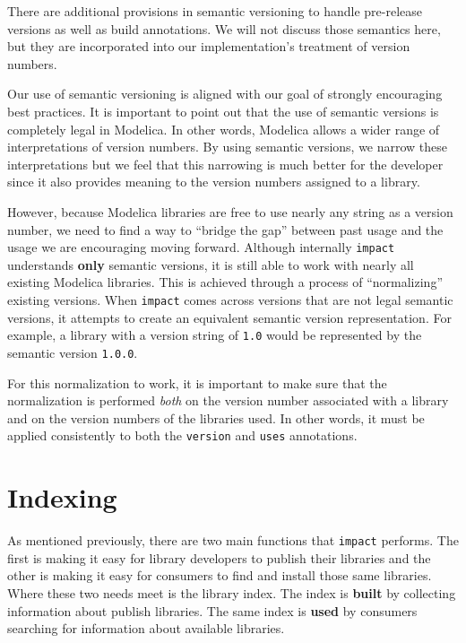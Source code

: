 \documentclass[11pt,a4paper,twocolumn]{article}
\newcommand{\code}[1]{\texttt{#1}} %
\begin{document}
There are additional provisions in semantic versioning to handle
pre-release versions as well as build annotations.  We will not
discuss those semantics here, but they are incorporated into our
implementation's treatment of version numbers.

Our use of semantic versioning is aligned with our goal of strongly
encouraging best practices.  It is important to point out that the use
of semantic versions is completely legal in Modelica.  In other words,
Modelica allows a wider range of interpretations of version numbers.
By using semantic versions, we narrow these interpretations but we
feel that this narrowing is much better for the developer since it
also provides meaning to the version numbers assigned to a library.

However, because Modelica libraries are free to use nearly any string
as a version number, we need to find a way to ``bridge the gap''
between past usage and the usage we are encouraging moving forward.
Although internally \code{impact} understands {\bf only} semantic
versions, it is still able to work with nearly all existing Modelica
libraries.  This is achieved through a process of ``normalizing''
existing versions.  When \code{impact} comes across versions that are
not legal semantic versions, it attempts to create an equivalent
semantic version representation.  For example, a library with a
version string of \code{1.0} would be represented by the semantic
version \code{1.0.0}.

For this normalization to work, it is important to make sure that the
normalization is performed {\em both} on the version number associated
with a library and on the version numbers of the libraries used.  In
other words, it must be applied consistently to both the
\code{version} and \code{uses} annotations.

\section{Indexing}

As mentioned previously, there are two main functions that
\code{impact} performs.  The first is making it easy for library
developers to publish their libraries and the other is making it easy
for consumers to find and install those same libraries.  Where these
two needs meet is the library index.  The index is {\bf built} by
collecting information about publish libraries.  The same index is
{\bf used} by consumers searching for information about available
libraries.
\end{document}
